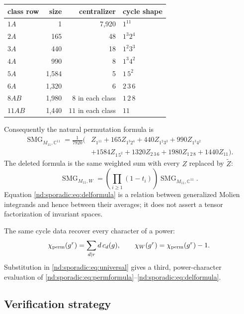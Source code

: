 \documentclass[10pt]{article}
\newcommand{\SMG}{\operatorname{SMG}}
\newcommand{\MGF}{\SMG}
\begin{document}
\begin{center}
\begin{tabular}{@{}lrrl@{}}
\toprule
class row & size & centralizer & cycle shape\\
\midrule
$1A$ & 1 & 7,920 & $1^{11}$\\
$2A$ & 165 & 48 & $1^3 2^4$\\
$3A$ & 440 & 18 & $1^2 3^3$\\
$4A$ & 990 & 8 & $1^3 4^2$\\
$5A$ & 1,584 & 5 & $1\,5^2$\\
$6A$ & 1,320 & 6 & $2\,3\,6$\\
$8AB$ & 1,980 & $8$ in each class & $1\,2\,8$\\
$11AB$ & 1,440 & $11$ in each class & $11$\\
\bottomrule
\end{tabular}
\end{center}

Consequently the natural permutation formula is
\begin{equation}\label{nd:sporadic:eq:permformula}
\boxed{\begin{aligned}
\MGF_{M_{11},\mathbb C^{11}}=\frac1{7920}\big(&
Z_{1^{11}}+165Z_{1^3 2^4}+440Z_{1^2 3^3}
+990Z_{1^3 4^2}\\
&+1584Z_{1\,5^2}+1320Z_{2\,3\,6}
+1980Z_{1\,2\,8}+1440Z_{11}\big).
\end{aligned}}
\end{equation}
The deleted formula is the same weighted sum with every $Z$ replaced by
$\widetilde Z$:
\begin{equation}\label{nd:sporadic:eq:delformula}
\boxed{\MGF_{M_{11},W}
=\left(\prod_{i\geq1}(1-t_i)\right)
\MGF_{M_{11},\mathbb C^{11}}.}
\end{equation}
Equation \eqref{nd:sporadic:eq:delformula} is a relation between generalized Molien
integrands and hence between their averages; it does not assert a tensor
factorization of invariant spaces.

The same cycle data recover every character of a power:
\begin{equation}\label{nd:sporadic:eq:powertrace}
\chi_{\rm perm}(g^r)=\sum_{d\mid r}d\,c_d(g),\qquad
\chi_W(g^r)=\chi_{\rm perm}(g^r)-1.
\end{equation}
Substitution in \eqref{nd:sporadic:eq:universal} gives a third, power-character evaluation
of \eqref{nd:sporadic:eq:permformula}--\eqref{nd:sporadic:eq:delformula}.

\subsection{Verification strategy}
\end{document}
